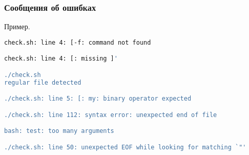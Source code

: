 \begin{frame}[fragile]
	\frametitle{Сообщения об ошибках}

	\begin{block}{Пример.}
		\begin{lstlisting}[language=bash]
check.sh: line 4: [-f: command not found 

check.sh: line 4: [: missing ]' 

./check.sh 
regular file detected 

./check.sh: line 5: [: my: binary operator expected 

./check.sh: line 112: syntax error: unexpected end of file 

bash: test: too many arguments

./check.sh: line 50: unexpected EOF while looking for matching `"'  

		\end{lstlisting}
	\end{block}

\end{frame}
